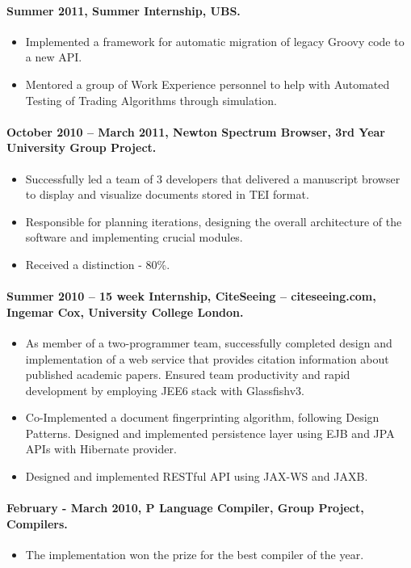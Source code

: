 \documentclass[11pt, a4paper]{article}
\newlength{\wideitemsep}
\let\olditem\item
\renewcommand{\item}{\setlength{\itemsep}{\wideitemsep}\olditem}
\begin{document}
\paragraph{Summer 2011, Summer Internship, UBS.}
\begin{itemize}
\item Implemented a framework for automatic migration of legacy Groovy code to a new API.
\item Mentored a group of Work Experience personnel to help with Automated Testing of Trading Algorithms through simulation.
\end{itemize}

\paragraph{October 2010 – March 2011, Newton Spectrum Browser, 3rd Year University Group Project.}
\begin{itemize}
\item Successfully led a team of 3 developers that delivered a manuscript browser to display and visualize documents stored in TEI format.
\item Responsible for planning iterations, designing the overall architecture of the software and implementing crucial modules. 
\item Received a distinction - 80\%.
\end{itemize}

\paragraph{Summer 2010 – 15 week Internship, CiteSeeing – citeseeing.com, Ingemar Cox, University College London.}
\begin{itemize}
\item As member of a two-programmer team, successfully completed design and implementation of a web service that provides citation information about published academic papers. Ensured team productivity and rapid development by employing JEE6 stack with Glassfishv3.
\item Co-Implemented a document fingerprinting algorithm, following Design Patterns. Designed and implemented persistence layer using EJB and JPA APIs with Hibernate provider.
\item Designed and implemented RESTful API using JAX-WS and JAXB.
\end{itemize}

\paragraph{February - March 2010, P Language Compiler, Group Project, Compilers.}
\begin{itemize}
\item The implementation won the prize for the best compiler of the year.
\end{itemize}
\end{document}
